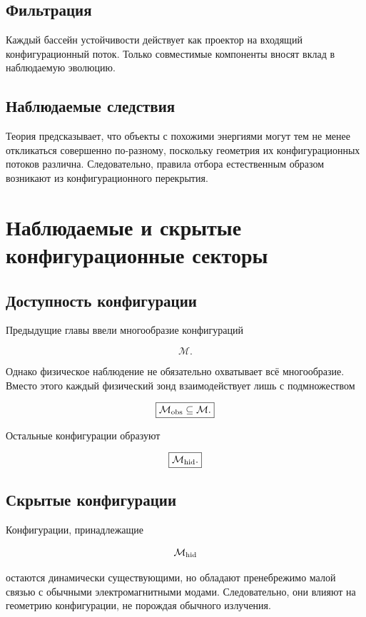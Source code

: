 \section{Фильтрация}

Каждый бассейн устойчивости действует как проектор на входящий конфигурационный поток. Только совместимые компоненты вносят вклад в наблюдаемую эволюцию.

\section{Наблюдаемые следствия}

Теория предсказывает, что объекты с похожими энергиями могут тем не менее откликаться совершенно по-разному, поскольку геометрия их конфигурационных потоков различна. Следовательно, правила отбора естественным образом возникают из конфигурационного перекрытия.

\chapter{Наблюдаемые и скрытые конфигурационные секторы}

\section{Доступность конфигурации}

Предыдущие главы ввели многообразие конфигураций

\[ \mathcal M. \]

Однако физическое наблюдение не обязательно охватывает всё многообразие. Вместо этого каждый физический зонд взаимодействует лишь с подмножеством

\[ \boxed{ \mathcal M_{\rm obs} \subseteq \mathcal M. } \]

Остальные конфигурации образуют

\[ \boxed{ \mathcal M_{\rm hid}. } \]

\section{Скрытые конфигурации}

Конфигурации, принадлежащие

\[ \mathcal M_{\rm hid} \]

остаются динамически существующими, но обладают пренебрежимо малой связью с обычными электромагнитными модами. Следовательно, они влияют на геометрию конфигурации, не порождая обычного излучения.

